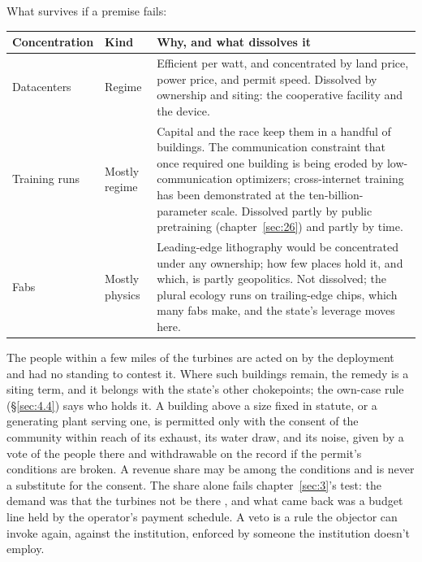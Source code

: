 What survives if a premise fails:

\begingroup\small\renewcommand{\arraystretch}{1.12}
\begin{longtable}{@{}>{\raggedright\arraybackslash}p{}>{\raggedright\arraybackslash}p{}>{\raggedright\arraybackslash}p{}@{}}
\hline
\textbf{Concentration} & \textbf{Kind} & \textbf{Why, and what dissolves it} \\
\hline
\endhead
Datacenters & Regime & Efficient per watt, and concentrated by land price, power price, and permit speed. Dissolved by ownership and siting: the cooperative facility and the device. \\ \hline
Training runs & Mostly regime & Capital and the race keep them in a handful of buildings. The communication constraint that once required one building is being eroded by low-communication optimizers; cross-internet training has been demonstrated at the ten-billion-parameter scale. Dissolved partly by public pretraining (chapter~\ref{sec:26}) and partly by time. \\ \hline
Fabs & Mostly physics & Leading-edge lithography would be concentrated under any ownership; how few places hold it, and which, is partly geopolitics. Not dissolved; the plural ecology runs on trailing-edge chips, which many fabs make, and the state's leverage moves here. \\ \hline
\end{longtable}
\endgroup

The people within a few miles of the turbines are acted on by the deployment and had no standing to contest it. Where such buildings remain, the remedy is a siting term, and it belongs with the state's other chokepoints; the own-case rule (\S\ref{sec:4.4}) says who holds it. A building above a size fixed in statute, or a generating plant serving one, is permitted only with the consent of the community within reach of its exhaust, its water draw, and its noise, given by a vote of the people there and withdrawable on the record if the permit's conditions are broken. A revenue share may be among the conditions and is never a substitute for the consent. The share alone fails chapter~\ref{sec:3}'s test: the demand was that the turbines not be there \autocite{naacp2026xai}, and what came back was a budget line held by the operator's payment schedule. A veto is a rule the objector can invoke again, against the institution, enforced by someone the institution doesn't employ.


